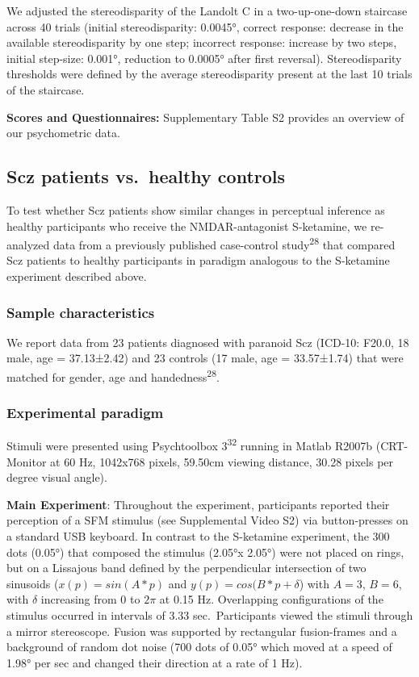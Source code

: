 \documentclass[
]{article}
\begin{document}
We adjusted the stereodisparity of the Landolt C in a two-up-one-down
staircase across 40 trials (initial stereodisparity: 0.0045°, correct
response: decrease in the available stereodisparity by one step;
incorrect response: increase by two steps, initial step-size: 0.001°,
reduction to 0.0005° after first reversal). Stereodisparity thresholds
were defined by the average stereodisparity present at the last 10
trials of the staircase.

\textbf{Scores and Questionnaires:} Supplementary Table S2 provides an
overview of our psychometric data.

\subsection{Scz patients vs.~healthy
controls}\label{scz-patients-vs.-healthy-controls}

To test whether Scz patients show similar changes in perceptual
inference as healthy participants who receive the NMDAR-antagonist
S-ketamine, we re-analyzed data from a previously published case-control
study\textsuperscript{28} that compared Scz patients to healthy
participants in paradigm analogous to the S-ketamine experiment
described above.

\subsubsection{Sample characteristics}\label{sample-characteristics-1}

We report data from 23 patients diagnosed with paranoid Scz (ICD-10:
F20.0, 18 male, age = 37.13±2.42) and 23 controls (17 male, age =
33.57±1.74) that were matched for gender, age and
handedness\textsuperscript{28}.

\subsubsection{Experimental paradigm}\label{experimental-paradigm-1}

Stimuli were presented using Psychtoolbox 3\textsuperscript{32} running
in Matlab R2007b (CRT-Monitor at 60 Hz, 1042x768 pixels, 59.50cm viewing
distance, 30.28 pixels per degree visual angle).

\textbf{Main Experiment}: Throughout the experiment, participants
reported their perception of a SFM stimulus (see Supplemental Video S2)
via button-presses on a standard USB keyboard. In contrast to the
S-ketamine experiment, the 300 dots (0.05°) that composed the stimulus
(2.05°x 2.05°) were not placed on rings, but on a Lissajous band defined
by the perpendicular intersection of two sinusoids (\(x(p) = sin(A*p)\)
and \(y(p) = cos(B*p + \delta\)) with \(A=3\), \(B=6\), with \(\delta\)
increasing from \(0\) to \(2\pi\) at 0.15 Hz. Overlapping configurations
of the stimulus occurred in intervals of 3.33 sec.~Participants viewed
the stimuli through a mirror stereoscope. Fusion was supported by
rectangular fusion-frames and a background of random dot noise (700 dots
of 0.05° which moved at a speed of 1.98° per sec and changed their
direction at a rate of 1 Hz).
\end{document}
